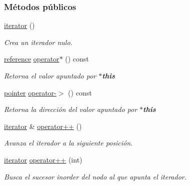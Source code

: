 \subsubsection*{Métodos públicos}
\begin{DoxyCompactItemize}
\item 
\hyperlink{classaed2_1_1map_1_1iterator_acdd790eb54216601a2e0591776004dba_acdd790eb54216601a2e0591776004dba}{iterator} ()
\begin{DoxyCompactList}\small\item\em Crea un iterador nulo. \end{DoxyCompactList}\item 
\hyperlink{classaed2_1_1map_1_1iterator_ac19788914a3110897e44c53f1318f6af_ac19788914a3110897e44c53f1318f6af}{reference} \hyperlink{classaed2_1_1map_1_1iterator_a48e75896997d516fe69bc18f889222fe_a48e75896997d516fe69bc18f889222fe}{operator$\ast$} () const 
\begin{DoxyCompactList}\small\item\em Retorna el valor apuntado por {\bfseries $\ast$this} \end{DoxyCompactList}\item 
\hyperlink{classaed2_1_1map_1_1iterator_a52ea7bdbf1dc6b252aec76633564bdf5_a52ea7bdbf1dc6b252aec76633564bdf5}{pointer} \hyperlink{classaed2_1_1map_1_1iterator_a227de3b56a6ff2e6bb6de2d08277ca60_a227de3b56a6ff2e6bb6de2d08277ca60}{operator-\/$>$} () const 
\begin{DoxyCompactList}\small\item\em Retorna la dirección del valor apuntado por {\bfseries $\ast$this} \end{DoxyCompactList}\item 
\hyperlink{classaed2_1_1map_1_1iterator}{iterator} \& \hyperlink{classaed2_1_1map_1_1iterator_a7c44de7f0508186e135ddbcfe782fec5_a7c44de7f0508186e135ddbcfe782fec5}{operator++} ()
\begin{DoxyCompactList}\small\item\em Avanza el iterador a la siguiente posición. \end{DoxyCompactList}\item 
\hyperlink{classaed2_1_1map_1_1iterator}{iterator} \hyperlink{classaed2_1_1map_1_1iterator_af4fe5565eb478cfccd254b2ef230b974_af4fe5565eb478cfccd254b2ef230b974}{operator++} (int)
\begin{DoxyCompactList}\small\item\em Busca el sucesor inorder del nodo al que apunta el iterador. \end{DoxyCompactList}\item 

\end{DoxyCompactItemize}
